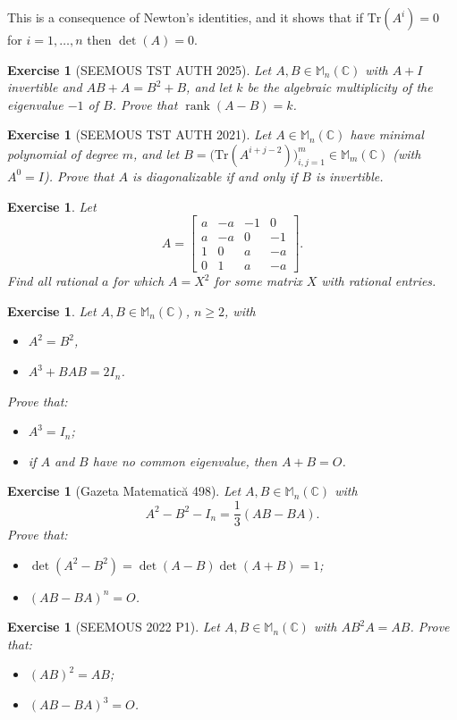 \documentclass[12pt]{article}
\renewcommand{\Tr}{\mathrm{Tr}}
\DeclareMathOperator{\Rank}{rank}
\theoremstyle{breakplain}
\theoremstyle{breakdef}
\newtheorem{ex}[subsubsection]{Exercise}
\theoremstyle{remark}
\begin{document}
This is a consequence of Newton's identities, and it shows that if $\Tr(A^i)=0$ for $i=1,\ldots ,n$ then $\det(A)=0$.
\begin{ex}[SEEMOUS TST AUTH 2025]
    Let $A,B \in \mathbb{M}_n(\mathbb{C})$ with $A+I$ invertible and $AB+A=B^2+B$, and let $k$ be the algebraic multiplicity of the eigenvalue $-1$ of $B$. Prove that $\Rank(A-B)=k$.
\end{ex}
\begin{ex}[SEEMOUS TST AUTH 2021]
    Let $A\in \mathbb{M}_n(\mathbb{C})$ have minimal polynomial of degree $m$, and let $B=\big(\Tr(A^{i+j-2})\big)_{i,j=1}^m\in \mathbb{M}_m(\mathbb{C})$ (with $A^0=I$). Prove that $A$ is diagonalizable if and only if $B$ is invertible.
\end{ex}
\begin{ex}
    Let
    \[A=\begin{bmatrix}
        a & -a & -1 & 0 \\
        a & -a & 0 & -1 \\
        1 & 0 & a & -a \\
        0 & 1 & a & -a
    \end{bmatrix}.\]
    Find all rational $a$ for which $A=X^2$ for some matrix $X$ with rational entries.
\end{ex}
\begin{ex}
    Let $A,B\in\mathbb{M}_n(\mathbb{C})$, $n\geq2$, with
    \begin{itemize}
        \item $A^2=B^2$,
        \item $A^3+BAB=2I_n$.
    \end{itemize}
    Prove that:
    \begin{itemize}
        \item $A^3=I_n$;
        \item if $A$ and $B$ have no common eigenvalue, then $A+B=O$.
    \end{itemize}
\end{ex}
\begin{ex}[Gazeta Matematic\u{a} 498]\label{GM}
    Let $A,B\in \mathbb{M}_n(\mathbb{C})$ with
    \[A^2-B^2-I_n=\frac{1}{3}(AB-BA).\]
    Prove that:
    \begin{itemize}
        \item $\det(A^2-B^2)=\det(A-B)\det(A+B)=1$;
        \item $(AB-BA)^n=O$.
    \end{itemize}
\end{ex}
\begin{ex}[SEEMOUS 2022 P1]\label{S22P1}
    Let $A,B\in \mathbb{M}_n(\mathbb{C})$ with $AB^2A=AB$. Prove that:
    \begin{itemize}
        \item $(AB)^2=AB$;
        \item $(AB-BA)^3=O$.
    \end{itemize}
\end{ex}
\newpage
\end{document}
